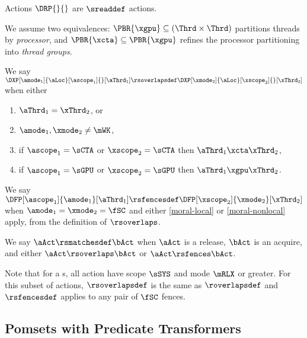 Actions $\DRP{}{}$ are $\sreaddef$ actions.

\begin{definition}
  We assume two equivalences:
  $\PBR{\xgpu}\subseteq(\Thrd\times\Thrd)$ partitions threads by
  \emph{processor}, and $\PBR{\xcta}\subseteq\PBR{\xgpu}$ refines the processor
  partitioning into \emph{thread groups}.
  
  We say
  $\DXP[\amode_1]{\aLoc}[\ascope_1]{}[\aThrd_1] \rsoverlapsdef
  \DXP[\xmode_2]{\aLoc}[\xscope_2]{}[\xThrd_2]$ when %
  either
  \begin{multicols}{2}
    \begin{enumerate}[,label=(2\alph*),ref=2\alph*]      
    \item[{\labeltext[1]{(1)}{moral-local}}]
    $\aThrd_1=\xThrd_2$, or
    \item $\amode_1,\xmode_2\neq\mWK$,
    \item if $\ascope_1=\sCTA$ or $\xscope_2=\sCTA$ then $\aThrd_1\xcta\xThrd_2$, %
    \item if $\ascope_1=\sGPU$ or $\xscope_2=\sGPU$ then $\aThrd_1\xgpu\xThrd_2$.
    \end{enumerate}
  \end{multicols}
  \smallskip

  We say
  $\DFP[\ascope_1]{\amode_1}[\aThrd_1] \rsfencesdef \DFP[\xscope_2]{\xmode_2}[\xThrd_2]$
  when $\amode_1=\xmode_2=\fSC$ and either \eqref{moral-local} or
  \eqref{moral-nonlocal} apply, from the definition of $\rsoverlaps$.

  We say $\aAct \rsmatchesdef \bAct$ when $\aAct$ is a release, $\bAct$ is an
  acquire, and either $\aAct\rsoverlaps \bAct$ or $\aAct\rsfences \bAct$.

\end{definition}

Note that for a \CPU{}s, all action have scope $\sSYS$ and mode $\mRLX$ or
greater.  For this subset of actions, $\rsoverlapsdef$ is the same as
$\roverlapsdef$ and $\rsfencesdef$ applies to any pair of $\fSC$ fences.






\subsection{Pomsets with Predicate Transformers}
\label{sec:pomsets}

